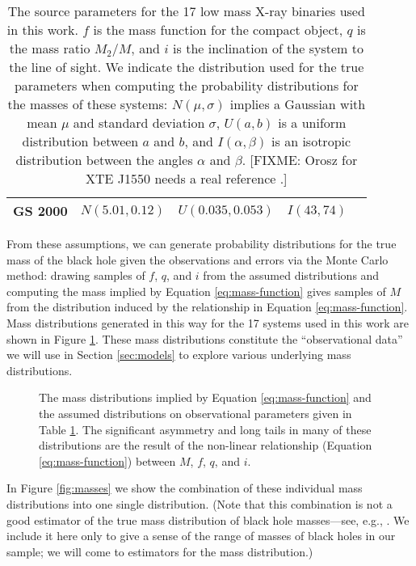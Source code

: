 \documentclass[preprint]{aastex}
\newcommand{\fixme}[1]{[FIXME: #1]}
\begin{document}
\begin{table}
\begin{center}
\begin{tabular}{|l|c|c|c|l|}
      GS 2000 & $N(5.01, 0.12)$ & $U(0.035, 0.053)$ & $I(43, 74)$ &
      \citet{Charles2006} \\
      \hline
    \end{tabular}
  \end{center}
  \caption{\label{tab:sources} The source parameters for the 17 low
    mass X-ray binaries used in this work.  $f$ is the mass function for
    the compact object, $q$ is the mass ratio $M_2/M$, and $i$ is the
    inclination of the system to the line of sight.  We indicate the
    distribution used for the true parameters when computing the
    probability distributions for the masses of these systems:
    $N(\mu,\sigma)$ implies a Gaussian with mean $\mu$ and standard
    deviation $\sigma$, $U(a,b)$ is a uniform distribution between $a$ and
    $b$, and $I(\alpha,\beta)$ is an isotropic distribution between the
    angles $\alpha$ and $\beta$.  \fixme{Orosz for XTE J1550 needs a
      real reference \citep{Orosz2010}.}} 
\end{table}

From these assumptions, we can generate probability distributions for
the true mass of the black hole given the observations and errors via
the Monte Carlo method: drawing samples of $f$, $q$, and $i$ from the
assumed distributions and computing the mass implied by Equation
\eqref{eq:mass-function} gives samples of $M$ from the distribution
induced by the relationship in Equation \eqref{eq:mass-function}.
Mass distributions generated in this way for the 17 systems used in
this work are shown in Figure \ref{fig:all-masses}.  These mass
distributions constitute the ``observational data'' we will use in
Section \ref{sec:models} to explore various underlying mass
distributions.

\begin{figure}
  \begin{center}
  \end{center}

  \caption{\label{fig:all-masses} The mass distributions implied by
    Equation \eqref{eq:mass-function} and the assumed distributions on
    observational parameters given in Table \ref{tab:sources}.  The
    significant asymmetry and long tails in many of these
    distributions are the result of the non-linear relationship
    (Equation \eqref{eq:mass-function}) between $M$, $f$, $q$, and
    $i$.}
\end{figure}

In Figure \ref{fig:masses} we show the combination of these individual
mass distributions into one single distribution.  (Note that this
combination is not a good estimator of the true mass distribution of
black hole masses---see, e.g., \citet{Mandel2010}.  We include it here
only to give a sense of the range of masses of black holes in our
sample; we will come to estimators for the mass distribution.)
\end{document}
